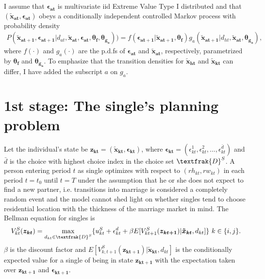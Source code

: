 I assume that $\boldsymbol{\epsilon_{at}}$ is multivariate iid Extreme Value Type I distributed and that $(\boldsymbol{\tilde{x}_{at}},\boldsymbol{\epsilon_{at}})$ obeys a conditionally independent controlled Markov process with probability density
\begin{align}
P(\boldsymbol{\tilde{x}_{at+1}},\boldsymbol{\epsilon_{at+1}}|d_{at},\boldsymbol{\tilde{x}_{at}},\boldsymbol{\epsilon_{at}},\boldsymbol{\theta_f},\boldsymbol{\theta_{g_a}}))=f(\boldsymbol{\epsilon_{at+1}}|\boldsymbol{\tilde{x}_{at+1}},\boldsymbol{\theta_f})g_a(\boldsymbol{\tilde{x}_{at+1}}|d_{ht},\boldsymbol{\tilde{x}_{at}},\boldsymbol{\theta_{g_a}}),
\label{eq:condi}
\end{align}
where $f(\cdot)$ and $g_a(\cdot)$ are the p.d.fs of $\boldsymbol{\epsilon_{at}}$ and $\boldsymbol{\tilde{x}_{at}}$, respectively, parametrized by $\boldsymbol{\theta_f}$ and $\boldsymbol{\theta_{g_a}}$. To emphasize that the transition densities for $\boldsymbol{\tilde{x}_{ht}}$ and $\boldsymbol{\tilde{x}_{kt}}$ can differ, I have added the subscript $a$ on $g_a$. 

\section{1st stage: The single's planning problem}
Let the individual's state be $\boldsymbol{z_{kt}}=(\boldsymbol{\tilde{x}_{kt}},\boldsymbol{\epsilon_{kt}})$, where $\boldsymbol{\epsilon_{kt}}=(\epsilon_{kt}^1,\epsilon_{kt}^2,...,\epsilon_{kt}^{\bar{d}})$ and $\bar{d}$ is the choice with highest choice index in the choice set $\textfrak{D}^S$. A person entering period $t$ as single optimizes with respect to $(rh_{kt},rw_{kt})$ in each period $t=t_0$ until $t=T$ under the assumption that he or she does not expect to find a new partner, i.e. transitions into marriage is considered a completely random event and the model cannot shed light on whether singles tend to choose residential location with the thickness of the marriage market in mind. The Bellman equation for singles is
\begin{align}
V_{kt}^S(\boldsymbol{z_{kt}})= \max_{d_{kt}\in \textfrak{D}^S}\{u_{kt}^S+\epsilon_{kt}^d+\beta E[V_{kt+1}^S(\boldsymbol{z_{kt+1}})|\boldsymbol{\tilde{x}_{kt}},d_{kt}]\} \text{ }k\in\{i,j\}.
\label{eq:Vk}
\end{align}
$\beta$ is the discount factor and $E[V_{k,t+1}^S(\boldsymbol{z_{kt+1}})|\boldsymbol{\tilde{x}_{kt}},d_{kt}]$ is the conditionally expected value for a single of being in state $\boldsymbol{z_{kt+1}}$ with the expectation taken over $\boldsymbol{z_{kt+1}}$ and $\boldsymbol{\epsilon_{kt+1}}$. 

